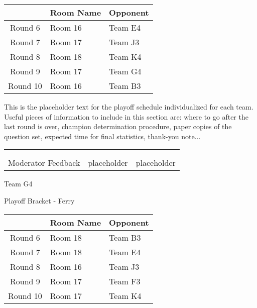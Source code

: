 \documentclass{article}%
\begin{document}
\vspace*{4pt}%
%
\begin{tabularx}{\textwidth}{|c|Y|Y|}%
\hline%
&Room Name&Opponent\\%
\hline%
Round 6&Room 16&Team E4\\%
Round 7&Room 17&Team J3\\%
Round 8&Room 18&Team K4\\%
Round 9&Room 17&Team G4\\%
Round 10&Room 16&Team B3\\%
\hline%
\end{tabularx}%
\vspace*{30pt}%
\linebreak%
This is the placeholder text for the playoff schedule individualized for each team. Useful pieces of information to include in this section are: where to go after the last round is over, champion determination procedure, paper copies of the question set, expected time for final statistics, thank{-}you note...%
\vspace*{30pt}%
\newline%
%
\begin{tabularx}{\textwidth}{YYY}%
  &  &  \\%
\\%
Moderator Feedback&placeholder&placeholder\\%
\end{tabularx}%
\newpage%
\begin{center}%
\begin{Huge}%
Team G4%
\end{Huge}%
\vspace*{12pt}%
\linebreak%
\begin{Large}%
Playoff Bracket {-} Ferry%
\end{Large}%
\end{center}%
\vspace*{4pt}%
%
\begin{tabularx}{\textwidth}{|c|Y|Y|}%
\hline%
&Room Name&Opponent\\%
\hline%
Round 6&Room 18&Team B3\\%
Round 7&Room 18&Team E4\\%
Round 8&Room 16&Team J3\\%
Round 9&Room 17&Team F3\\%
Round 10&Room 17&Team K4\\%
\hline%
\end{tabularx}%
\end{document}
